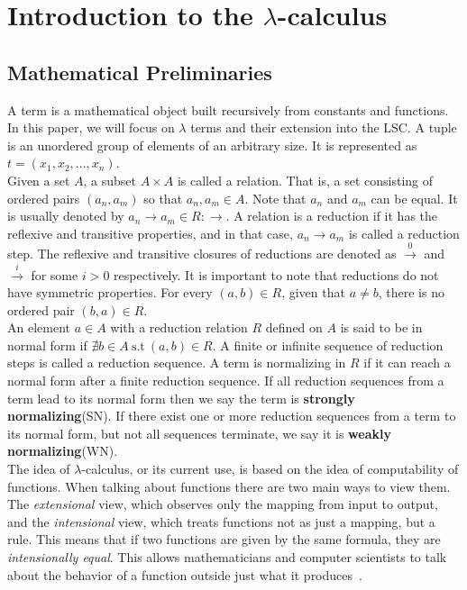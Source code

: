 \documentclass[11pt]{article}
\begin{document}
\section{Introduction to the $\lambda$-calculus}\label{intro-lambda}
 \subsection{Mathematical Preliminaries}
 A term is a mathematical object built recursively from constants and functions. In this paper, we will focus on $\lambda$ terms and their extension into the LSC.
 A tuple is an unordered group of elements of an arbitrary size. It is represented as $t = (x_1,x_2,...,x_n)$. \\
 Given a set $A$, a subset $A \times A$ is called a relation. That is, a set consisting of ordered pairs $(a_n,a_m)$ so that $a_n,a_m \in A$. Note that $a_n$ and $a_m$ can be equal. It is usually denoted by $a_n \rightarrow a_m \in R : \rightarrow$. A relation is a reduction if it has the reflexive and transitive properties, and in that case, $a_n \rightarrow a_m$ is called a reduction step.
 The reflexive and transitive closures of reductions are denoted as $\xrightarrow{0}$ and $\xrightarrow{i}$ for some $i > 0$ respectively. It is important to note that reductions do not have symmetric properties. For every $(a,b) \in R$, given that $a \neq b$, there is no ordered pair $(b,a) \in R$. \\
 An element $a \in A$ with a reduction relation $R$ defined on $A$ is said to be in normal form if $\nexists b \in A \ \text{s.t} \ (a,b) \in R$.
 A finite or infinite sequence of reduction steps is called a reduction sequence.
 A term is normalizing in $R$ if it can reach a normal form after a finite reduction sequence. If all reduction sequences from a term lead to its normal form then we say the term is \textbf{strongly normalizing}(SN). If there exist one or more reduction sequences from a term to its normal form, but not all sequences terminate, we say it is \textbf{weakly normalizing}(WN). \\
The idea of $\lambda$-calculus, or its current use, is based on the idea of computability of functions. When talking about functions there are two main ways to view them. The \textit{extensional} view, which observes only the mapping from input to output, and the \textit{intensional} view, which treats functions not as just a mapping, but a rule. This means that if two functions are given by the same formula, they are \textit{intensionally equal}. This allows mathematicians and computer scientists to talk about the behavior of a function outside just what it produces~\cite{selinger}.
\end{document}
